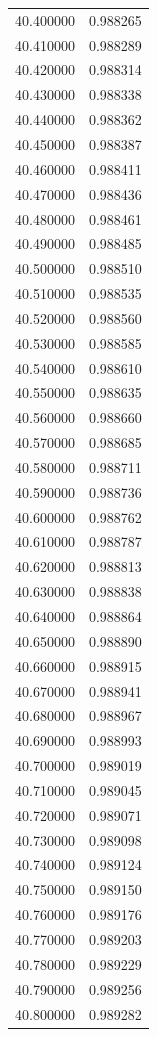 \begin{tabular}{rr}
40.400000 & 0.988265 \\
40.410000 & 0.988289 \\
40.420000 & 0.988314 \\
40.430000 & 0.988338 \\
40.440000 & 0.988362 \\
40.450000 & 0.988387 \\
40.460000 & 0.988411 \\
40.470000 & 0.988436 \\
40.480000 & 0.988461 \\
40.490000 & 0.988485 \\
40.500000 & 0.988510 \\
40.510000 & 0.988535 \\
40.520000 & 0.988560 \\
40.530000 & 0.988585 \\
40.540000 & 0.988610 \\
40.550000 & 0.988635 \\
40.560000 & 0.988660 \\
40.570000 & 0.988685 \\
40.580000 & 0.988711 \\
40.590000 & 0.988736 \\
40.600000 & 0.988762 \\
40.610000 & 0.988787 \\
40.620000 & 0.988813 \\
40.630000 & 0.988838 \\
40.640000 & 0.988864 \\
40.650000 & 0.988890 \\
40.660000 & 0.988915 \\
40.670000 & 0.988941 \\
40.680000 & 0.988967 \\
40.690000 & 0.988993 \\
40.700000 & 0.989019 \\
40.710000 & 0.989045 \\
40.720000 & 0.989071 \\
40.730000 & 0.989098 \\
40.740000 & 0.989124 \\
40.750000 & 0.989150 \\
40.760000 & 0.989176 \\
40.770000 & 0.989203 \\
40.780000 & 0.989229 \\
40.790000 & 0.989256 \\
40.800000 & 0.989282 \\

\end{tabular}

